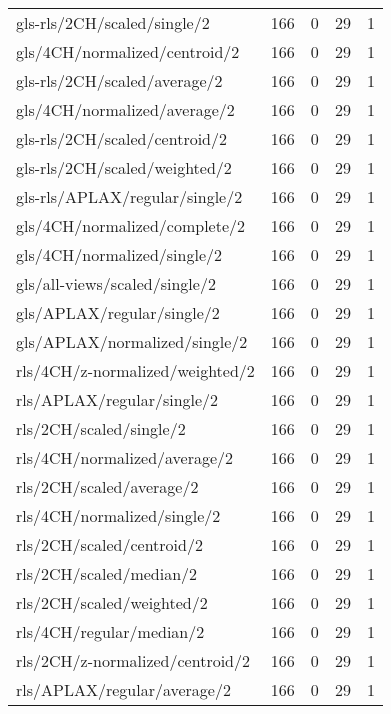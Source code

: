 \begin{longtable}{lrrrr}
    gls-rls/2CH/scaled/single/2               & 166 &  0 & 29 &  1 \\
    gls/4CH/normalized/centroid/2             & 166 &  0 & 29 &  1 \\
    gls-rls/2CH/scaled/average/2              & 166 &  0 & 29 &  1 \\
    gls/4CH/normalized/average/2              & 166 &  0 & 29 &  1 \\
    gls-rls/2CH/scaled/centroid/2             & 166 &  0 & 29 &  1 \\
    gls-rls/2CH/scaled/weighted/2             & 166 &  0 & 29 &  1 \\
    gls-rls/APLAX/regular/single/2            & 166 &  0 & 29 &  1 \\
    gls/4CH/normalized/complete/2             & 166 &  0 & 29 &  1 \\
    gls/4CH/normalized/single/2               & 166 &  0 & 29 &  1 \\
    gls/all-views/scaled/single/2             & 166 &  0 & 29 &  1 \\
    gls/APLAX/regular/single/2                & 166 &  0 & 29 &  1 \\
    gls/APLAX/normalized/single/2             & 166 &  0 & 29 &  1 \\
    rls/4CH/z-normalized/weighted/2           & 166 &  0 & 29 &  1 \\
    rls/APLAX/regular/single/2                & 166 &  0 & 29 &  1 \\
    rls/2CH/scaled/single/2                   & 166 &  0 & 29 &  1 \\
    rls/4CH/normalized/average/2              & 166 &  0 & 29 &  1 \\
    rls/2CH/scaled/average/2                  & 166 &  0 & 29 &  1 \\
    rls/4CH/normalized/single/2               & 166 &  0 & 29 &  1 \\
    rls/2CH/scaled/centroid/2                 & 166 &  0 & 29 &  1 \\
    rls/2CH/scaled/median/2                   & 166 &  0 & 29 &  1 \\
    rls/2CH/scaled/weighted/2                 & 166 &  0 & 29 &  1 \\
    rls/4CH/regular/median/2                  & 166 &  0 & 29 &  1 \\
    rls/2CH/z-normalized/centroid/2           & 166 &  0 & 29 &  1 \\
    rls/APLAX/regular/average/2               & 166 &  0 & 29 &  1 \\

\end{longtable}
